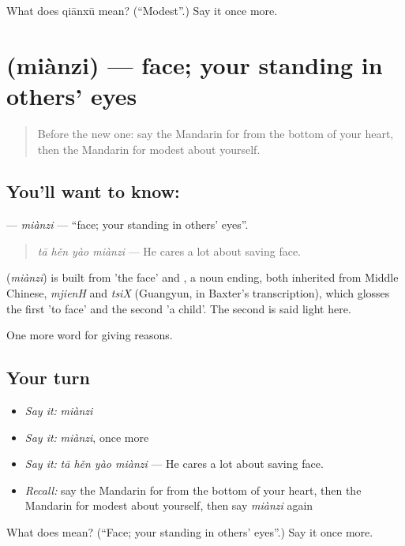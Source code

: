 \begin{tcolorbox}[breakable,colback=teal!4,colframe=teal!35!black,title={Before you move on}]
What does qiānxū mean? (\textquotedblleft{}Modest\textquotedblright{}.) Say it once more.
\end{tcolorbox}
\section[\texorpdfstring{\zh{面子} (miànzi)}{面子 (miànzi)}]{ (miànzi) — face; your standing in others' eyes}

\label{lesson:ZH-C358-mianzi}



\begin{quote}
Before the new one: say the Mandarin for from the bottom of your heart, then the Mandarin for modest about yourself.
\end{quote}

\subsection*{You'll want to know: }
\textbf{} — \emph{miànzi} — \textquotedblleft{}face; your standing in others' eyes\textquotedblright{}.

\begin{quote}
\textbf{} \emph{tā hěn yào miànzi} — He cares a lot about saving face.
\end{quote}

\begin{cousinweb}
\textbf{} (\emph{miànzi}) is built from  'the face' and , a noun ending, both inherited from Middle Chinese, \emph{mjienH} and \emph{tsiX} (Guangyun, in Baxter's transcription), which glosses the first 'to face' and the second 'a child'. The second is said light here.
\end{cousinweb}

\begin{grammarlens}[title={What you've built}]
One more word for giving reasons.
\end{grammarlens}

\subsection*{Your turn}
\begin{itemize}
\raggedright
  \item \emph{Say it:} \emph{miànzi}
  \item \emph{Say it:} \emph{miànzi}, once more
  \item \emph{Say it:} \emph{tā hěn yào miànzi} — He cares a lot about saving face.
  \item \emph{Recall:} say the Mandarin for from the bottom of your heart, then the Mandarin for modest about yourself, then say \emph{miànzi} again
\end{itemize}

\begin{tcolorbox}[breakable,colback=teal!4,colframe=teal!35!black,title={Before you move on}]
What does  mean? (\textquotedblleft{}Face; your standing in others' eyes\textquotedblright{}.) Say it once more.
\end{tcolorbox}
